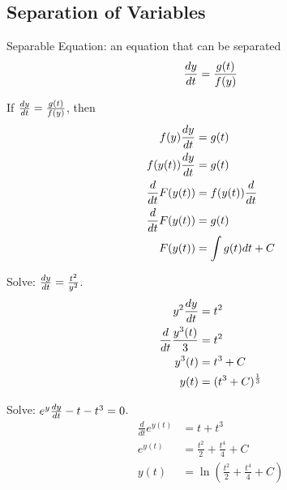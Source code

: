 \documentclass[12pt]{article}
\begin{document}
\subsection{Separation of Variables} 
\begin{definition} Separable Equation: an equation that can be separated $$\frac{dy}{dt} = \frac{g(t)}{f(y)} $$ \end{definition} 
If $\frac{dy}{dt} = \frac{g(t)}{f(y)}$, then $$\begin{aligned} f(y)\frac{dy}{dt} &= g(t) \\ f(y(t))\frac{dy}{dt} &= g(t) \\ \frac{d}{dt}F(y(t)) &= f(y(t))\frac{d}{dt} \\ \frac{d}{dt}F(y(t)) &= g(t) \\ F(y(t)) &= \int g(t)dt + C \end{aligned} $$ 
\begin{example} Solve: $\frac{dy}{dt} = \frac{t^2}{y^2}$. $$\begin{aligned} y^2\frac{dy}{dt} &= t^2 \\ \frac{d}{dt}\frac{y^3(t)}{3} &= t^2 \\ y^3(t) &= t^3 + C \\ y(t) &= (t^3 + C)^{\frac{1}{3}} \end{aligned} $$ \end{example} 
\begin{example} Solve: $e^y\frac{dy}{dt} - t - t^3 = 0$. $$\begin{aligned} \frac{d}{dt}e^{y(t)} &= t + t^3 \\ e^{y(t)} &= \frac{t^2}{2} + \frac{t^4}{4} + C \\ y(t) &= \ln(\frac{t^2}{2} + \frac{t^4}{4} + C) \end{aligned} $$ \end{example}
\end{document}
